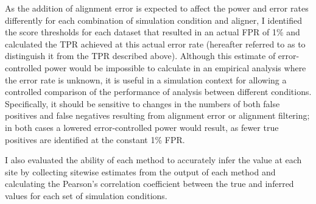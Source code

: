 As the addition of alignment error is expected to affect the power and
error rates differently for each combination of simulation condition
and aligner, I identified the score thresholds for each dataset that
resulted in an actual FPR of 1\% and calculated the TPR achieved at
this actual error rate (hereafter referred to as \tpr{} to distinguish
it from the TPR described above). Although this estimate of
error-controlled power would be impossible to calculate in an
empirical analysis where the error rate is unknown, it is useful in a
simulation context for allowing a controlled comparison of the
performance of \sw analysis between different
conditions. Specifically, it should be sensitive to changes in the
numbers of both false positives and false negatives resulting from
alignment error or alignment filtering; in both cases a lowered
error-controlled power would result, as fewer true positives are
identified at the constant 1\% FPR.

I also evaluated the ability of each method to accurately infer the
\omg value at each site by collecting sitewise \omg estimates from
the output of each method and calculating the Pearson's correlation
coefficient between the true and inferred \omg values for each set
of simulation conditions.

